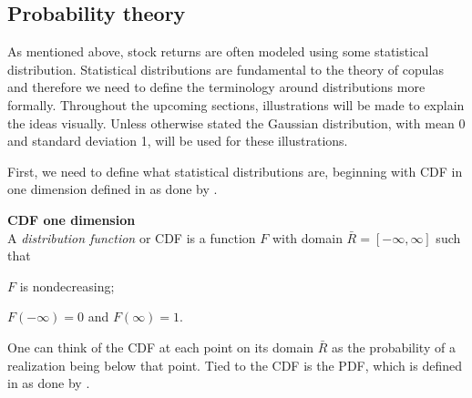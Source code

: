 





\subsection{Probability theory}
As mentioned above, stock returns are often modeled using some statistical distribution. Statistical distributions are fundamental to the theory of copulas and therefore we need to define the terminology around distributions more formally. Throughout the upcoming sections, illustrations will be made to explain the ideas visually. Unless otherwise stated the Gaussian distribution, with mean 0 and standard deviation 1, will be used for these illustrations.

First, we need to define what statistical distributions are, beginning with \gls{CDF} in one dimension defined in  as done by .
\begin{definition}\label{def:CDF1d} \textbf{CDF one dimension }\\
    A \emph{distribution function} or \gls{CDF} is a function $F$ with domain $\bar{R} = [-\infty, \infty]$ such that 
    \begin{compactenum}
        \item $F$ is nondecreasing; 
        \item $F(-\infty)=0$ and $F(\infty)=1$.
    \end{compactenum}
\end{definition}

One can think of the \gls{CDF} at each point on its domain $\bar{R}$ as the probability of a realization being below that point. Tied to the \gls{CDF} is the \gls{PDF}, which is defined in  as done by .

